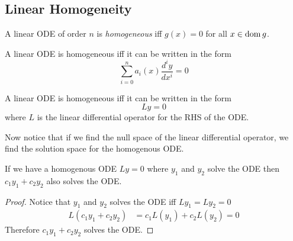 \documentclass[notes.tex]{subfiles}
\begin{document}
\subsection{Linear Homogeneity}
\begin{definition}
    A linear ODE of order $n$ is \textit{homogeneous} iff $g(x) = 0$ for all $x \in \operatorname{dom} g$.
\end{definition}
\begin{lemma}
    A linear ODE is homogeneous iff it can be written in the form
    \[
        \sum_{i = 0}^n a_i(x)\frac{d^i y}{dx^i} = 0
    \]
\end{lemma}
\begin{lemma}
    A linear ODE is homogeneous iff it can be written in the form
    \[
        Ly = 0
    \]
    where $L$ is the linear differential operator for the RHS of the ODE.
\end{lemma}
Now notice that if we find the null space of the linear differential operator, we find the solution space for the homogenous ODE.

\begin{theorem}
    If we have a homogenous ODE $Ly = 0$ where $y_1$ and $y_2$ solve the ODE then $c_1y_1 + c_2y_2$ also solves the ODE.
\end{theorem}
\begin{proof}
    Notice that $y_1$ and $y_2$ solves the ODE iff $Ly_1 = Ly_2 = 0$
    \begin{align*}
        L(c_1y_1 + c_2y_2)
        &= c_1L(y_1) + c_2L(y_2)
        = 0
    \end{align*}
    Therefore $c_1y_1 + c_2y_2$ solves the ODE.
\end{proof}
\end{document}
